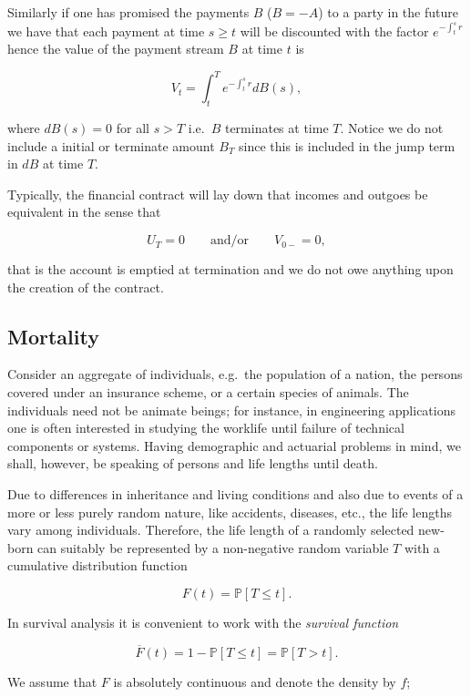 \documentclass[a4paper,10pt,openany]{book}
\begin{document}
Similarly if one has promised the payments \(B\) (\(B=-A\)) to a party in the future we have that each payment at time \(s\ge t\) will be discounted with the factor \(e^{-\int_t^s r}\) hence the value of the payment stream \(B\) at time \(t\) is

\[
V_t=\int_t^Te^{-\int_t^sr}dB(s),\tag{12}
\]

where \(dB(s)=0\) for all \(s>T\) i.e.~\(B\) terminates at time \(T\). Notice we do not include a initial or terminate amount \(B_T\) since this is included in the jump term in \(dB\) at time \(T\).

Typically, the financial contract will lay down that incomes and outgoes be equivalent in the sense that

\[
U_T =0\qquad \text{and/or}\qquad V_{0-}=0,\tag{13}
\]

that is the account is emptied at termination and we do not owe anything upon the creation of the contract.

\hypertarget{mortality}{%
\subsection{Mortality}\label{mortality}}

Consider an aggregate of individuals, e.g.~the population of a nation, the persons covered under an insurance scheme, or a certain species of animals. The individuals need not be animate beings; for instance, in engineering applications one is often interested in studying the worklife until failure of technical components or systems. Having demographic and actuarial problems in mind, we shall, however, be speaking of persons and life lengths until death.

Due to differences in inheritance and living conditions and also due to events of a more or less purely random nature, like accidents, diseases, etc., the life lengths vary among individuals. Therefore, the life length of a randomly selected new-born can suitably be represented by a non-negative random variable \(T\) with a cumulative distribution function

\[
F(t)=\mathbb P[T\le t].\tag{1}
\]

In survival analysis it is convenient to work with the \emph{survival function}

\[
\overline F(t)=1 -\mathbb P[T\le t]=\mathbb P[T> t].\tag{2}
\]

We assume that \(F\) is absolutely continuous and denote the density by \(f\);
\end{document}
